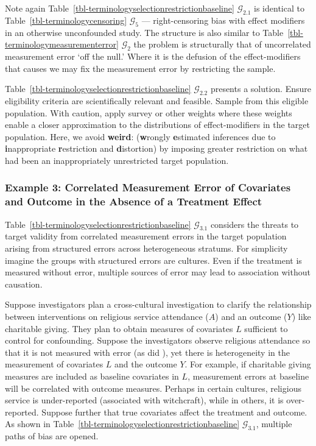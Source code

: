 \documentclass[
  single column]{article}
\begin{document}
Note again Table~\ref{tbl-terminologyselectionrestrictionbaseline}
\(\mathcal{G}_{2.1}\) is identical to
Table~\ref{tbl-terminologycensoring} \(\mathcal{G}_5\) ---
right-censoring bias with effect modifiers in an otherwise unconfounded
study. The structure is also similar to
Table~\ref{tbl-terminologymeasurementerror} \(\mathcal{G}_2\) the
problem is structurally that of uncorrelated measurement error `off the
null.' Where it is the defusion of the effect-modifiers that causes we
may fix the measurement error by restricting the sample.

Table~\ref{tbl-terminologyselectionrestrictionbaseline}
\(\mathcal{G}_{2.2}\) presents a solution. Ensure eligibility criteria
are scientifically relevant and feasible. Sample from this eligible
population. With caution, apply survey or other weights where these
weights enable a closer approximation to the distributions of
effect-modifiers in the target population. Here, we avoid
\textbf{weird}: (\textbf{w}rongly \textbf{e}stimated inferences due to
\textbf{i}nappropriate \textbf{r}estriction and \textbf{d}istortion) by
imposing greater restriction on what had been an inappropriately
unrestricted target population.

\subsubsection{Example 3: Correlated Measurement Error of Covariates and
Outcome in the Absence of a Treatment
Effect}\label{example-3-correlated-measurement-error-of-covariates-and-outcome-in-the-absence-of-a-treatment-effect}

Table~\ref{tbl-terminologyselectionrestrictionbaseline}
\(\mathcal{G}_{3.1}\) considers the threats to target validity from
correlated measurement errors in the target population arising from
structured errors across heterogeneous stratums. For simplicity imagine
the groups with structured errors are cultures. Even if the treatment is
measured without error, multiple sources of error may lead to
association without causation.

Suppose investigators plan a cross-cultural investigation to clarify the
relationship between interventions on religious service attendance
(\(A\)) and an outcome (\(Y\)) like charitable giving. They plan to
obtain measures of covariates \(L\) sufficient to control for
confounding. Suppose the investigators observe religious attendance so
that it is not measured with error (as did
), yet
there is heterogeneity in the measurement of covariates \(L\) and the
outcome \(Y\). For example, if charitable giving measures are included
as baseline covariates in \(L\), measurement errors at baseline will be
correlated with outcome measures. Perhaps in certain cultures, religious
service is under-reported (associated with witchcraft), while in others,
it is over-reported. Suppose further that true covariates affect the
treatment and outcome. As shown in
Table~\ref{tbl-terminologyselectionrestrictionbaseline}
\(\mathcal{G}_{3.1}\), multiple paths of bias are opened.
\end{document}
